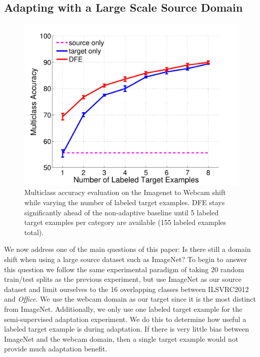 




\subsection{Adapting with a Large Scale Source Domain}

\begin{figure}[h]
  \begin{center}
  \includegraphics[width=.48\textwidth]{figs/imagenet_webcam_vary_num_target_examples}
  \end{center}
  \caption{Multiclass accuracy evaluation on the Imagenet to Webcam shift while varying the number of labeled target examples. DFE stays significantly ahead of the non-adaptive baseline until 5 labeled target examples per category are available (155 labeled examples total).}
  \label{fig:vary_num_target}
\end{figure}

We now address one of the main questions of this paper: Is there still a domain shift when using a large source dataset such as ImageNet? To begin to answer this question we follow the same experimental paradigm of taking 20 random train/test splits as the previous experiment, but use ImageNet as our source dataset and limit ourselves to the 
16 overlapping classes between ILSVRC2012 and \emph{Office}.  We use the webcam domain as our target since it is the most distinct from ImageNet. 
Additionally, we only use one labeled target example for the semi-supervised adaptation experiment. We do this to determine how useful a labeled target example is during adaptation. If there is very little bias between ImageNet and the webcam domain, then a single target example would not provide much adaptation benefit.

